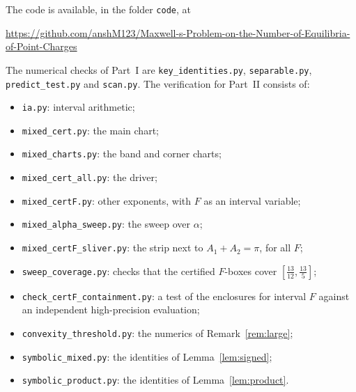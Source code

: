 \documentclass[11pt]{amsart}
\theoremstyle{remark}
\begin{document}
The code is available, in the folder \texttt{code}, at
\begin{center}
\footnotesize\url{https://github.com/anshM123/Maxwell-s-Problem-on-the-Number-of-Equilibria-of-Point-Charges}
\end{center}
The numerical checks of Part~I are \texttt{key\_identities.py}, \texttt{separable.py},
\texttt{predict\_test.py} and \texttt{scan.py}. The verification for Part~II consists of:
\begin{itemize}
\item \texttt{ia.py}: interval arithmetic;
\item \texttt{mixed\_cert.py}: the main chart;
\item \texttt{mixed\_charts.py}: the band and corner charts;
\item \texttt{mixed\_cert\_all.py}: the driver;
\item \texttt{mixed\_certF.py}: other exponents, with $F$ as an interval variable;
\item \texttt{mixed\_alpha\_sweep.py}: the sweep over $\alpha$;
\item \texttt{mixed\_certF\_sliver.py}: the strip next to $A_1+A_2=\pi$, for all $F$;
\item \texttt{sweep\_coverage.py}: checks that the certified $F$-boxes cover $[\tfrac{13}{12},\tfrac{13}5]$;
\item \texttt{check\_certF\_containment.py}: a test of the enclosures for interval $F$ against an independent
  high-precision evaluation;
\item \texttt{convexity\_threshold.py}: the numerics of Remark~\ref{rem:large};
\item \texttt{symbolic\_mixed.py}: the identities of Lemma~\ref{lem:signed};
\item \texttt{symbolic\_product.py}: the identities of Lemma~\ref{lem:product}.
\end{itemize}
\end{document}
